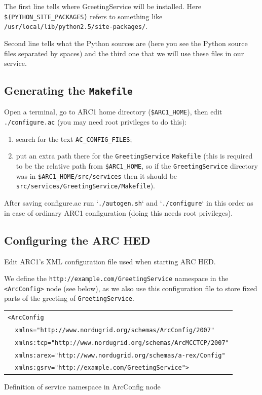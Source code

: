 \documentclass{article}
\begin{document}
The first line tells where GreetingService will be installed. Here
\verb#$(PYTHON_SITE_PACKAGES)# refers to something like
\verb#/usr/local/lib/python2.5/site-packages/#.

Second line tells what the Python sources are (here you see the Python
source files separated by spaces) and the third one that we will use
these files in our service.

\subsection{Generating the \texttt{Makefile}}

Open a terminal, go to ARC1 home directory (\verb#$ARC1_HOME#), then
edit \verb#./configure.ac# (you may need root privileges to do this):

\begin{enumerate}

\item search for the text \verb#AC_CONFIG_FILES#;

\item put an extra path there for the \verb#GreetingService#
  \verb#Makefile# (this is required to be the relative path from
  \verb#$ARC1_HOME#, so if the \verb#GreetingService# directory was in
  \verb#$ARC1_HOME/src/services# then it should be
  \verb#src/services/GreetingService/Makefile#).

\end{enumerate}

After saving configure.ac run `\verb#./autogen.sh#` and
`\verb#./configure#` in this order as in case of ordinary ARC1 configuration (doing this needs root privileges).

\clearpage

\subsection{Configuring the ARC HED}

Edit ARC1's XML configuration file used when starting ARC HED.

We define the \verb#http://example.com/GreetingService# namespace in
the \verb#<ArcConfig># node (see below), as we also use this
configuration file to store fixed parts of the greeting of
\verb#GreetingService#.

\begin{illustration}
\begin{center}
\begin{tabular}{|l|}
\hline
\verb#<ArcConfig#\\ 
\verb#  xmlns="http://www.nordugrid.org/schemas/ArcConfig/2007"#\\
\verb#  xmlns:tcp="http://www.nordugrid.org/schemas/ArcMCCTCP/2007"#\\
\verb#  xmlns:arex="http://www.nordugrid.org/schemas/a-rex/Config"#\\
\verb#  xmlns:gsrv="http://example.com/GreetingService">#\\
\hline
\end{tabular}
\end{center}
\caption{Definition of service namespace in ArcConfig node}
\end{illustration}
\end{document}

